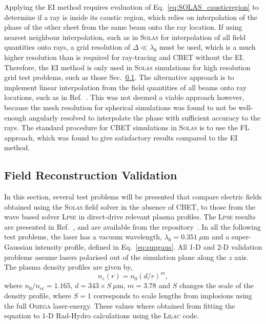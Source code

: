 Applying the \ac{EI} method requires evaluation of Eq.~\ref{eq:SOLAS_causticregion} to determine if a ray is inside its caustic region, which relies on interpolation of the phase of the other sheet from the same beam onto the ray location.
If using nearest neighbour interpolation, such as in \textsc{Solas} for interpolation of all field quantities onto rays, a grid resolution of $\Delta\ll\lambda_0$ must be used, which is a much higher resolution than is required for ray-tracing and \ac{CBET} without the \ac{EI}.
Therefore, the \ac{EI} method is only used in \textsc{Solas} simulations for high resolution grid test problems, such as those Sec.~\ref{sec:SOLAS_field_validation}.
The alternative approach is to implement linear interpolation from the field quantities of all beams onto ray locations, such as in Ref.~\cite{follett_validation_2022}.
This was not deemed a viable approach however, because the mesh resolution for spherical simulations was found to not be well-enough angularly resolved to interpolate the phase with sufficient accuracy to the rays.
The standard procedure for \ac{CBET} simulations in \textsc{Solas} is to use the \ac{FL} approach, which was found to give satisfactory results compared to the \ac{EI} method.

\subsection{Field Reconstruction Validation}%
\label{sec:SOLAS_field_validation}

In this section, several test problems will be presented that compare electric fields obtained using the \textsc{Solas} field solver in the absence of \ac{CBET}, to those from the wave based solver \textsc{Lpse} in direct-drive relevant plasma profiles.
The \textsc{Lpse} results are presented in Ref.~\cite{follett_validation_2022}, and are available from the repository~\cite{follett_lpse_2022}.
In all the following test problems, the laser has a vacuum wavelength, $\lambda_0=0.351\ \mu\text{m}$ and a super-Gaussian intensity profile, defined in Eq.~\ref{eq:supgaus}.
All 1-D and 2-D validation problems assume lasers polarised out of the simulation plane along the $z$ axis.
The plasma density profiles are given by,
\begin{equation}%
    \label{eq:SOLAS_test_ne}
    n_e(r) = n_0 (d/r)^{m},
\end{equation}
where $n_0/n_{\text{cr}} = 1.165$, $d = 343\times S\ \mu\text{m}$, $m=3.78$ and $S$ changes the scale of the density profile, where $S=1$ corresponds to scale lengths from implosions using the full \textsc{Omega} laser-energy.
These values where obtained from fitting the equation to 1-D \ac{Rad-Hydro} calculations using the \textsc{Lilac} code.

